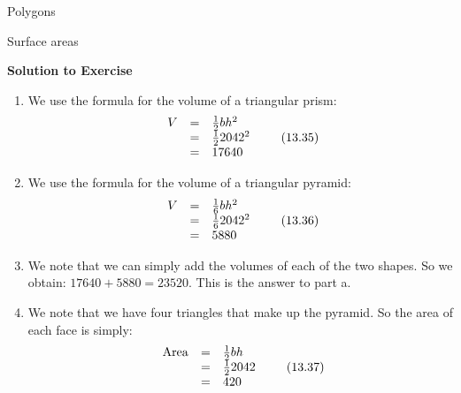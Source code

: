 \begin{exercises}{Polygons}
\begin{exercises}{Surface areas }
{\begin{mdframed}[linewidth=4, leftmargin=40, rightmargin=40]
\begin{exercise}
\begin{figure}[H]
\begin{center}
    \end{center}

 \end{figure}   

    \addtocounter{footnote}{-0}
    \par 
\vspace{5pt}
\label{m39357*solid7634}\noindent\textbf{Solution to Exercise }
\label{m39357*id6375}\begin{enumerate}[noitemsep, label=\textbf{Step} \textbf{\arabic*}. ] 
            \leftskip=20pt\rightskip=\leftskip\item We use the formula for the volume of a triangular prism:
\label{m39357*id6923}\nopagebreak\noindent{}
    \begin{equation}
    \begin{array}{ccc}V& =& \frac{1}{2}b{h}^{2}\hfill \\ & =& \frac{1}{2}20{42}^{2}\hfill \\ & =& 17640\hfill \end{array}\tag{13.35}
      \end{equation}
    
\item We use the formula for the volume of a triangular pyramid:
\label{m39357*id67423}\nopagebreak\noindent{}
    \begin{equation}
    \begin{array}{ccc}V& =& \frac{1}{6}b{h}^{2}\hfill \\ & =& \frac{1}{6}20{42}^{2}\hfill \\ & =& 5880\hfill \end{array}\tag{13.36}
      \end{equation}
    
\item We note that we can simply add the volumes of each of the two shapes. So we obtain: $17640+5880=23520$. This is the answer to part a.\item We note that we have four triangles that make up the pyramid. So the area of each face is simply:
\label{m39357*id6783}\nopagebreak\noindent{}
    \begin{equation}
    \begin{array}{ccc}\mathrm{Area}& =& \frac{1}{2}bh\hfill \\ & =& \frac{1}{2}2042\hfill \\ & =& 420\hfill \end{array}\tag{13.37}
      \end{equation}
    


\end{enumerate}
\end{exercise}
\end{mdframed}}
\end{exercises}
\end{exercises}
